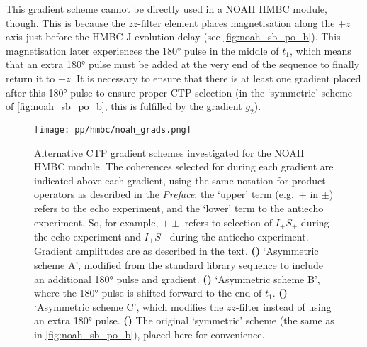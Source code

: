 This gradient scheme cannot be directly used in a NOAH HMBC module, though.
This is because the $zz$-filter element places  magnetisation along the $+z$ axis just before the HMBC J-evolution delay (see \cref{fig:noah_sb_po_b}).
This magnetisation later experiences the \proton{} \ang{180} pulse in the middle of $t_1$, which means that an extra \ang{180} pulse must be added at the very end of the sequence to finally return it to $+z$.
It is necessary to ensure that there is at least one gradient placed after this \ang{180} pulse to ensure proper CTP selection (in the `symmetric' scheme of \cref{fig:noah_sb_po_b}, this is fulfilled by the gradient $g_2$).

\begin{figure}[!htbp]
    \centering
    \texttt{[image: pp/hmbc/noah\_grads.png]}%
    {\label{fig:noah_hmbc_grads_bga}}%
    {\label{fig:noah_hmbc_grads_bgb}}%
    {\label{fig:noah_hmbc_grads_bgc}}%
    {\label{fig:noah_hmbc_grads_b}}%
    \caption[Alternative CTP gradient schemes investigated for NOAH HMBC]{
        Alternative CTP gradient schemes investigated for the NOAH HMBC module.
        The coherences selected for during each gradient are indicated above each gradient, using the same notation for product operators as described in the \textit{Preface}: the `upper' term (e.g.\ $+$ in $\pm$) refers to the echo experiment, and the `lower' term to the antiecho experiment.
        So, for example, $+\pm$ refers to selection of $I_+S_+$ during the echo experiment and $I_+S_-$ during the antiecho experiment.
        Gradient amplitudes are as described in the text.
        \textbf{()} `Asymmetric scheme A', modified from the standard library sequence to include an additional \ang{180} pulse and gradient.
        \textbf{()} `Asymmetric scheme B', where the \ang{180} pulse is shifted forward to the end of $t_1$.
        \textbf{()} `Asymmetric scheme C', which modifies the $zz$-filter instead of using an extra \ang{180} pulse.
        \textbf{()} The original `symmetric' scheme (the same as in \cref{fig:noah_sb_po_b}), placed here for convenience.
    }
    \label{fig:noah_hmbc_grads}
\end{figure}

